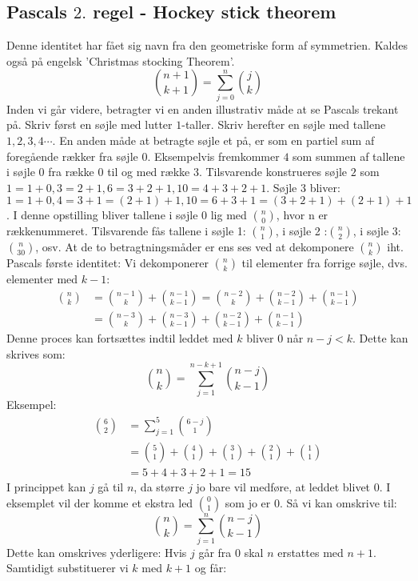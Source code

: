 \subsection{Pascals \(2.\) regel - Hockey stick theorem}
Denne identitet har fået sig navn fra den geometriske form af symmetrien. Kaldes også på engelsk 'Christmas stocking Theorem'. 
\begin{equation}
\binom{n+1}{k+1}=\sum_{j=0}^{n}\binom{j}{k}\label{HockeyStick}
\end{equation}
Inden vi går videre, betragter vi en anden illustrativ måde at se Pascals trekant på. Skriv først en søjle med lutter \(1\)-taller. Skriv herefter en søjle med tallene \(1,2,3,4 \dotsm \). En anden måde at betragte søjle et på, er som en partiel sum af foregående rækker fra søjle \(0\). Eksempelvis fremkommer \(4\) som summen af tallene i søjle \(0\) fra række \(0\) til og med række \(3\). Tilsvarende konstrueres søjle \(2\) som \(1=1+0, 3=2+1, 6=3+2+1, 10=4+3+2+1\). Søjle 3 bliver: \(1=1+0, 4=3+1=(2+1)+1, 10=6+3+1=(3+2+1)+(2+1)+1\). I denne opstilling bliver tallene i søjle \(0\) lig med \(\binom{n}{0}\), hvor n er rækkenummeret. Tilsvarende fås tallene i søjle 1: \(\binom{n}{1}\), i søjle 2 :\(\binom{n}{2}\), i søjle 3:\(\binom{n}{30}\), osv. At de to betragtningsmåder er ens ses ved at dekomponere \(\binom{n}{k}\) iht. Pascals første identitet: Vi dekomponerer \(\binom{n}{k}\) til elementer fra forrige søjle, dvs. elementer med \(k-1\):
\begin{align*}
\binom{n}{k}&=\binom{n-1}{k}+\binom{n-1}{k-1}=\binom{n-2}{k}+\binom{n-2}{k-1}+\binom{n-1}{k-1}\\
&=\binom{n-3}{k}+\binom{n-3}{k-1}+\binom{n-2}{k-1}+\binom{n-1}{k-1}
\end{align*}
Denne proces kan fortsættes indtil leddet med \(k\) bliver \(0\) når \(n-j<k\). Dette kan skrives som:
\[\binom{n}{k}=\sum_{j=1}^{n-k+1}\binom{n-j}{k-1}\]
Eksempel:
\begin{align*}
\binom{6}{2}&=\sum_{j=1}^{5}\binom{6-j}{1}\\
&=\binom{5}{1}+\binom{4}{1}+\binom{3}{1}+\binom{2}{1}+\binom{1}{1}\\
&=5+4+3+2+1=15
\end{align*}
I princippet kan \(j\) gå til \(n\), da større \(j\) jo bare vil medføre, at leddet blivet \(0\). I eksemplet vil der komme et ekstra led \(\binom{0}{1}\) som jo er \(0\). Så vi kan omskrive til:
\[\binom{n}{k}=\sum_{j=1}^{n}\binom{n-j}{k-1}\]
Dette kan omskrives yderligere: Hvis \(j\) går fra \(0\) skal \(n\) erstattes med \(n+1\). Samtidigt substituerer vi \(k\) med \(k+1\) og får:
